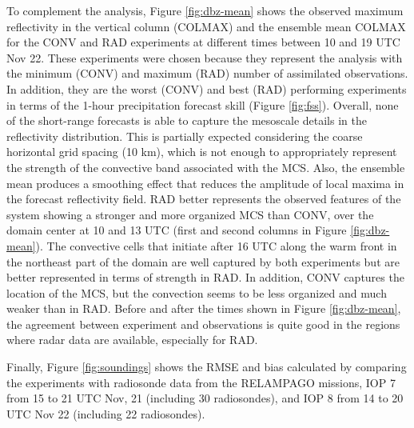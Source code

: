 \documentclass[final,5p,times,twocolumn,authoryear]{elsarticle} %
\begin{document}
To complement the analysis, Figure \ref{fig:dbz-mean} shows the observed maximum reflectivity in the vertical column (COLMAX) and the ensemble mean COLMAX for the CONV and RAD experiments at different times between 10 and 19 UTC Nov 22. These experiments were chosen because they represent the analysis with the minimum (CONV) and maximum (RAD) number of assimilated observations. In addition, they are the worst (CONV) and best (RAD) performing experiments in terms of the 1-hour precipitation forecast skill (Figure \ref{fig:fss}). Overall, none of the short-range forecasts is able to capture the mesoscale details in the reflectivity distribution. This is partially expected considering the coarse horizontal grid spacing (10 km), which is not enough to appropriately represent the strength of the convective band associated with the MCS. Also, the ensemble mean produces a smoothing effect that reduces the amplitude of local maxima in the forecast reflectivity field. RAD better represents the observed features of the system showing a stronger and more organized MCS than CONV, over the domain center at 10 and 13 UTC (first and second columns in Figure \ref{fig:dbz-mean}). The convective cells that initiate after 16 UTC along the warm front in the northeast part of the domain are well captured by both experiments but are better represented in terms of strength in RAD. In addition, CONV captures the location of the MCS, but the convection seems to be less organized and much weaker than in RAD. Before and after the times shown in Figure \ref{fig:dbz-mean}, the agreement between experiment and observations is quite good in the regions where radar data are available, especially for RAD.

Finally, Figure \ref{fig:soundings} shows the RMSE and bias calculated by comparing the experiments with radiosonde data from the RELAMPAGO missions, IOP 7 from 15 to 21 UTC Nov, 21 (including 30 radiosondes), and IOP 8 from 14 to 20 UTC Nov 22 (including 22 radiosondes).
\end{document}
